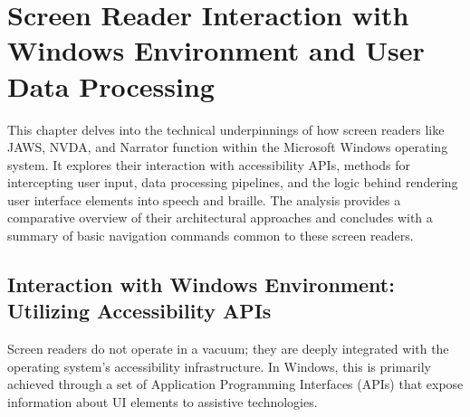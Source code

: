 \chapter{Screen Reader Interaction with Windows Environment and User Data Processing}
\label{cha:screen-reader-interaction-with-windows-environment-and-user-data-processing}

This chapter delves into the technical underpinnings of how screen readers like JAWS, NVDA, and Narrator function within the Microsoft Windows operating system. It explores their interaction with accessibility APIs, methods for intercepting user input, data processing pipelines, and the logic behind rendering user interface elements into speech and braille. The analysis provides a comparative overview of their architectural approaches and concludes with a summary of basic navigation commands common to these screen readers.

\section{Interaction with Windows Environment: Utilizing Accessibility APIs}
\label{sec:interaction-with-windows-environment-utilizing-accessibility-apis}

Screen readers do not operate in a vacuum; they are deeply integrated with the operating system's accessibility infrastructure. In Windows, this is primarily achieved through a set of Application Programming Interfaces (APIs) that expose information about UI elements to assistive technologies.

